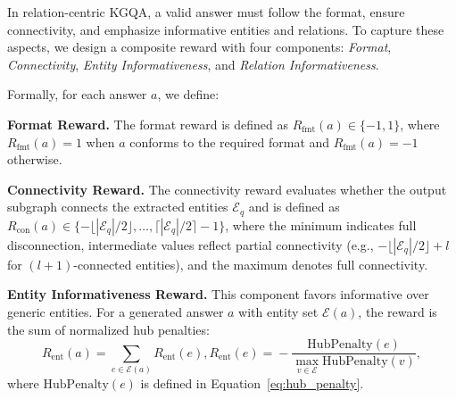 In relation-centric KGQA, a valid answer must follow the format, ensure connectivity, and emphasize informative entities and relations.  
To capture these aspects, we design a composite reward with four components: \emph{Format}, \emph{Connectivity}, \emph{Entity Informativeness}, and \emph{Relation Informativeness}.


Formally, for each answer $a$, we define:

\textbf{Format Reward.} The format reward is defined as $R_{\mathrm{fmt}}(a) \in \{-1,1\}$, where $R_{\mathrm{fmt}}(a) = 1$ when $a$ conforms to the required format and $R_{\mathrm{fmt}}(a) = -1$ otherwise.

\textbf{Connectivity Reward.}
The connectivity reward evaluates whether the output subgraph connects the extracted entities $\mathcal{E}_q$ and is defined as $R_{\mathrm{con}}(a) \in \{-\lfloor |\mathcal{E}_q|/2 \rfloor, \dots, \lceil |\mathcal{E}_q|/2 \rceil - 1\}$, where the minimum indicates full disconnection, intermediate values reflect partial connectivity (e.g., $-\lfloor |\mathcal{E}_q|/2 \rfloor + l$ for $(l+1)$-connected entities), and the maximum denotes full connectivity.



\textbf{Entity Informativeness Reward.} 
This component favors informative over generic entities.  
For a generated answer $a$ with entity set $\mathcal{E}(a)$,  
the reward is the sum of normalized hub penalties:
\vspace{-1em}
\small
\begin{equation}\label{eq:entity_informativenss}
R_{\mathrm{ent}}(a) = \!\!\!\!\sum_{e \in \mathcal{E}(a)} \!\!\!R_{\mathrm{ent}}(e), R_{\mathrm{ent}}(e) \!= \!\!- \frac{\mathrm{HubPenalty}(e)}{\max_{v \in \mathcal{E}} \mathrm{HubPenalty}(v)},
\end{equation}
\normalsize
where $\mathrm{HubPenalty}(e)$ is defined in Equation~\ref{eq:hub_penalty}.

